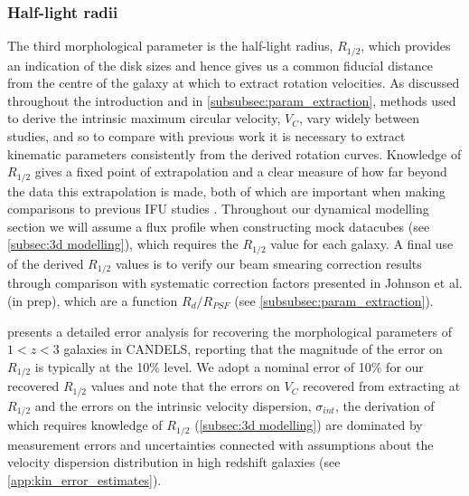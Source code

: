 \documentclass[fleqn,usenatbib]{mn2e}
\begin{document}
\subsubsection{Half-light radii}\label{subsubsection:half-light_radii}
The third morphological parameter is the half-light radius, $R_{1/2}$, which provides an indication of the disk sizes and hence gives us a common fiducial distance from the centre of the galaxy at which to extract rotation velocities.
As discussed throughout the introduction and in \cref{subsubsec:param_extraction}, methods used to derive the intrinsic maximum circular velocity, $V_{C}$, vary widely between studies, and so to compare with previous work it is necessary to extract kinematic parameters consistently from the derived rotation curves.
Knowledge of $R_{1/2}$ gives a fixed point of extrapolation and a clear measure of how far beyond the data this extrapolation is made, both of which are important when making comparisons to previous IFU studies \citep[e.g.][]{ForsterSchreiber2009,Epinat2012,Wisnioski2015,Stott2016,Harrison2017,Swinbank2017}.
Throughout our dynamical modelling section we will assume a flux profile when constructing mock datacubes (see \cref{subsec:3d modelling}), which requires the $R_{1/2}$ value for each galaxy.
A final use of the derived $R_{1/2}$ values is to verify our beam smearing correction results through comparison with systematic correction factors presented in Johnson et al. (in prep), which are a function $R_{d} / R_{PSF}$ (see \cref{subsubsec:param_extraction}).

\cite{Bruce2012} presents a detailed error analysis for recovering the morphological parameters of $1 < z < 3$ galaxies in CANDELS, reporting that the magnitude of the error on $R_{1/2}$ is typically at the 10$\%$ level.
We adopt a nominal error of 10$\%$ for our recovered $R_{1/2}$ values and note that the errors on $V_{C}$ recovered from extracting at $R_{1/2}$ and the errors on the intrinsic velocity dispersion, $\sigma_{int}$, the derivation of which requires knowledge of $R_{1/2}$ (\cref{subsec:3d modelling}) are dominated by measurement errors and uncertainties connected with assumptions about the velocity dispersion distribution in high redshift galaxies (see \cref{app:kin_error_estimates}).
\end{document}
